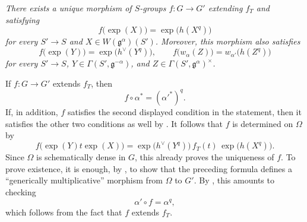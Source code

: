\begin{center}
\end{center}

\emph{There exists a unique morphism of \(S\)-groups
\(f\colon G\to G'\) extending \(f_T\) and satisfying}
\[
  f\bigl(\exp(X)\bigr)=\exp\bigl(h(X^q)\bigr)
\]
\emph{for every \(S'\to S\) and
\(X\in W(\mathfrak g^\alpha)(S')\).  Moreover, this morphism also
satisfies}
\[
  f\bigl(\exp(Y)\bigr)=\exp\bigl(h^\vee(Y^q)\bigr),
  \qquad
  f\bigl(w_\alpha(Z)\bigr)
    =w_{\alpha'}\bigl(h(Z^q)\bigr)
\]
\emph{for every \(S'\to S\),
\(Y\in\Gamma(S',\mathfrak g^{-\alpha})\), and
\(Z\in\Gamma(S',\mathfrak g^\alpha)^\times\).}

If \(f\colon G\to G'\) extends \(f_T\), then
\[
  f\circ\alpha^\ast=(\alpha'^\ast)^q.
\]
If, in addition, \(f\) satisfies the second displayed condition in
the statement, then it satisfies the other two conditions as well by
.  It follows that \(f\) is determined on \(\Omega\) by
\[
  f\bigl(\exp(Y)t\exp(X)\bigr)
  =
  \exp\bigl(h^\vee(Y^q)\bigr)\,
  f_T(t)\,
  \exp\bigl(h(X^q)\bigr).
\]
Since \(\Omega\) is schematically dense in \(G\), this already proves
the uniqueness of \(f\).  To prove existence, it is enough, by
, to show that the preceding formula defines a
``generically multiplicative'' morphism from \(\Omega\) to \(G'\).
By , this amounts to checking
\[
  \alpha'\circ f=\alpha^q,
\]
which follows from the fact that \(f\) extends \(f_T\).

